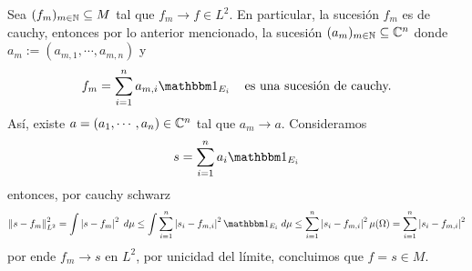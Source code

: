 \documentclass{article}
\begin{document}
\begin{enumerate}
    Sea $(f_{m})_{m\in\mathbb{N}}\subseteq M$ tal que $f_{m}\to f\in L^{2}$. En particular, la sucesión 
    $f_{m}$ es de cauchy, entonces por lo anterior mencionado, la sucesión $(a_{m})_{m\in\mathbb{N}}
    \subseteq\mathbb{C}^{n}$ donde $a_{m}:=(a_{m,1},\cdots,a_{m,n})$ y
    \begin{equation*}
        f_{m}=\sum_{i=1}^{n}a_{m,i}\I_{E_{i}}\hspace{4mm}\text{es una sucesión de cauchy.}
    \end{equation*}
    Así, existe $a=(a_{1},\cdots,a_{n})\in\mathbb{C}^{n}$ tal que $a_{m}\to a$. Consideramos
    \begin{equation*}
        s=\sum_{i=1}^{n}a_{i}\I_{E_{i}}
    \end{equation*}
    entonces, por cauchy schwarz
    \begin{equation*}
        \norm{s-f_{m}}_{L^{2}}^{2}=\int\abs{s-f_{m}}^{2}\hspace{1mm}d\mu
        \leq\int\sum_{i=1}^{n}\abs{s_{i}-f_{m,i}}^{2}\I_{E_{i}}\hspace{1mm}d\mu
        \leq\sum_{i=1}^{n}\abs{s_{i}-f_{m,i}}^{2}\mu(\Omega)=\sum_{i=1}^{n}\abs{s_{i}-f_{m,i}}^{2}
    \end{equation*}
    por ende $f_{m}\to s$ en $L^{2}$, por unicidad del límite, concluimos que $f=s\in M$.
    

\end{enumerate}
\end{document}
